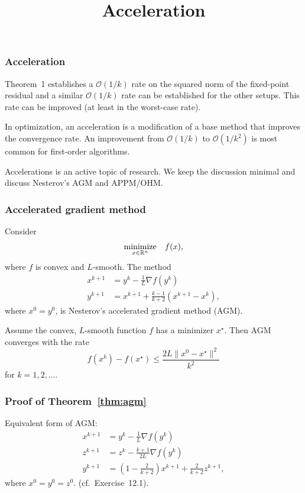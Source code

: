 \documentclass[10pt,mathserif]{beamer}
\title{\large \bfseries Acceleration}
\begin{document}
\frame{
\thispagestyle{empty}
\titlepage
}


\begin{frame}
\frametitle{Acceleration}
Theorem~1 establishes a $\mathcal{O}(1/k)$ rate on the squared norm of the fixed-point residual and a similar $\mathcal{O}(1/k)$ rate can be established for the other setups.
This rate can be improved (at least in the worst-case rate).

\vspace{0.2in}

In optimization, an acceleration is a modification of a base method that improves the convergence rate.
An improvement from $\mathcal{O}(1/k)$ to $\mathcal{O}(1/k^2)$ is most common for first-order algorithms.

\vspace{0.2in}

Accelerations is an active topic of research. We keep the discussion minimal and discuss Nesterov's AGM and APPM/OHM.
\end{frame}


\begin{frame}
\frametitle{Accelerated gradient method}
Consider 
\begin{align*}
\begin{array}{ll}
\underset{x\in \mathbb{R}^n}{\mbox{minimize}}
  &f(x),
  \end{array}
\end{align*}
where $f$ is convex and $L$-smooth.
The method
\begin{align*}
x^{k+1}&=y^k-\frac{1}{L} \nabla f(y^k)\\
y^{k+1}&=x^{k+1}+\frac{k-1}{k+2}(x^{k+1}-x^{k}),
\end{align*}
where $x^0=y^0$, is Nesterov's accelerated gradient method (AGM).
\vspace{0.2in}

\setcounter{theorem}{16}
\begin{theorem}
\label{thm:agm}
Assume the convex, $L$-smooth function $f$ has a minimizer $x^\star$.
Then AGM converges with the rate
\[
f(x^k)-f(x^\star)
\le 
\frac{2L\|x^0-x^\star\|^2}{k^2}
\]
for $k=1,2,\dots$.
\end{theorem}
\end{frame}

\begin{frame}
\frametitle{Proof of Theorem~\ref{thm:agm}}
Equivalent form of AGM:
\begin{align*}
x^{k+1}&=y^k-\frac{1}{L} \nabla f(y^k)\\
z^{k+1}&=z^k-\frac{k+1}{2L}\nabla f(y^k)\\
y^{k+1}&=\left(1-\frac{2}{k+2}\right)x^{k+1}+\frac{2}{k+2}z^{k+1},
\end{align*}
where $x^0=y^0=z^0$.
 (cf.\ Exercise~12.1).
\end{frame}
\end{document}
